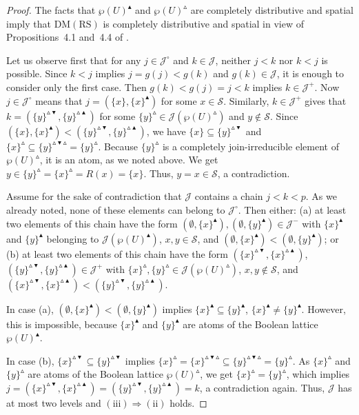 \documentclass[11pt,a4paper]{amsart}
\newcommand{\UP}{\blacktriangle}
\newcommand{\DOWN}{\blacktriangledown}
\newcommand{\Up}{\vartriangle}
\theoremstyle{plain}
\theoremstyle{definition}
\theoremstyle{remark}
\numberwithin{equation}{section}
\begin{document}
\begin{proof}
The facts that $\wp(U)^\UP$ and $\wp(U)^\Up$ are completely
distributive and spatial imply that $\mathrm{DM(RS)}$ is completely distributive and spatial in view of 
Propositions~{4.1} and~{4.4} of \cite{JarRad25}.

Let us observe first that for any $j \in \mathcal{J}^{\circ}$ 
and $k \in \mathcal{J}$, neither $j < k$ nor $k < j$ is  
possible. Since $k < j$ implies $j = g(j) < g(k)$ and 
$g(k) \in \mathcal{J}$, it is enough to consider only
the first case. Then $g(k)<g(j)=j<k$ implies $k \in \mathcal{J}^{+}$. 
Now $j \in \mathcal{J}^{\circ}$ means that 
$j = (\{x\},\{x\}^\UP)$ for some $x\in \mathcal{S}$. Similarly,
$k \in \mathcal{J}^{+}$ gives that 
$k=(\{y\}^{\Up \DOWN},\{y\}^{\Up\UP})$ for some
$\{y\}^{\Up}\in\mathcal{J}(\wp(U)^\Up)$ and $y\notin \mathcal{S}$. 
Since $(\{x\},\{x\}^\UP) < (\{y\}^{\Up\DOWN},\{y\}^{\Up\UP})$,
we have $\{x\} \subseteq \{y\}^{\Up\DOWN}$ and
$\{x\}^\Up \subseteq \{y\}^{\Up\DOWN \Up} = \{y\}^\Up$.
Because $\{y\}^\Up$ is a completely join-irreducible element of 
$\wp(U)^\Up$, it is an atom, as we noted above. 
We get $y \in \{y\}^\Up = \{x\}^\Up = R(x) = \{x\}$. 
Thus, $y = x \in \mathcal{S}$, a contradiction.

Assume for the sake of contradiction that $\mathcal{J}$ 
contains a chain $j < k < p$.
As we already noted, none of these elements can belong to 
$\mathcal{J}^{\circ}$. 
Then either: (a) at least two elements of this chain have the 
form $(\emptyset,\{x\}^\UP),(\emptyset,\{y\}^\UP)\in \mathcal{J}^-$ with 
$\{x\}^\UP$ and $\{y\}^\UP$ belonging to $\mathcal{J}(\wp(U)^\UP)$, 
$x,y\in \mathcal{S}$, and $(\emptyset,\{x\}^\UP)<(\emptyset,\{y\}^\UP)$; 
or (b) at least two elements of this chain have the form 
$(\{x\}^{\Up\DOWN},\{x\}^{\Up\UP})$, $(\{y\}^{\Up\DOWN},\{y\}^{\Up\UP})\in \mathcal{J}^{+}$ with 
$\{x\}^{\Up}, \{y\}^{\Up}\in\mathcal{J}(\wp(U)^{\Up})$, 
$x,y \notin \mathcal{S}$, and 
$(\{x\}^{\Up\DOWN},\{x\}^{\Up\UP})<(\{y\}^{\Up\DOWN},\{y\}^{\Up\UP})$.

In case (a), $(\emptyset,\{x\}^\UP)<(\emptyset,\{y\}^\UP)$ implies 
$\{x\}^\UP \subseteq\{y\}^\UP$, $\{x\}^\UP\neq\{y\}^\UP$.
However, this is impossible, because $\{x\}^\UP$ and
$\{y\}^\UP$ are atoms of the Boolean lattice $\wp(U)^\UP$. 

In case (b), $\{x\}^{\Up\DOWN} \subseteq \{y\}^{\Up\DOWN}$ 
implies $\{x\}^{\Up} = \{x\}^{\Up\DOWN\Up} \subseteq 
\{y\}^{\Up \DOWN\Up} = \{y\}^{\Up}$. As $\{x\}^{\Up}$ and $\{y\}^{\Up}$ 
are atoms of the Boolean lattice $\wp(U)^\Up$, 
we get $\{x\}^{\Up} = \{y\}^{\Up}$, which implies 
$j=(\{x\}^{\Up\DOWN },\{x\}^{\Up\UP}) = 
(\{y\}^{\Up\DOWN},\{y\}^{\Up\UP})=k$, a contradiction again. Thus, 
$\mathcal{J}$ has at most two levels and 
$\mathrm{(iii)}\Rightarrow\mathrm{(ii)}$ holds.
\end{proof}
\end{document}
